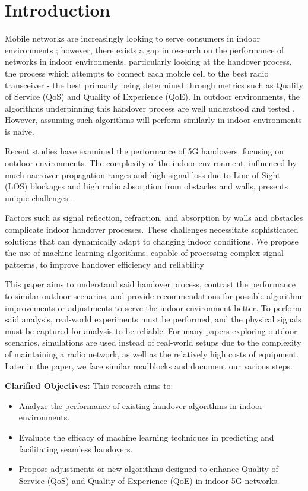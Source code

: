 \chapter{Introduction}
Mobile networks are increasingly looking to serve consumers in indoor environments \insertref; however, there exists a gap in research on the performance of networks in indoor environments, particularly looking at the handover process, the process which attempts to connect each mobile cell to the best radio transceiver - the best primarily being determined through metrics such as Quality of Service (QoS) and Quality of Experience (QoE). In outdoor environments, the algorithms underpinning this handover process are well understood and tested \insertref. However, assuming such algorithms will perform similarly in indoor environments is naive.

Recent studies have examined the performance of 5G handovers, focusing on outdoor environments. The complexity of the indoor environment, influenced by much narrower propagation ranges and high signal loss due to Line of Sight (LOS) blockages and high radio absorption from obstacles and walls, presents unique challenges \insertref.

Factors such as signal reflection, refraction, and absorption by walls and obstacles complicate indoor handover processes. These challenges necessitate sophisticated solutions that can dynamically adapt to changing indoor conditions. We propose the use of machine learning algorithms, capable of processing complex signal patterns, to improve handover efficiency and reliability \insertref

This paper aims to understand said handover process, contrast the performance to similar outdoor scenarios, and provide recommendations for possible algorithm improvements or adjustments to serve the indoor environment better. To perform said analysis, real-world experiments must be performed, and the physical signals must be captured for analysis to be reliable. For many papers exploring outdoor scenarios, simulations are used instead of real-world setups due to the complexity of maintaining a radio network, as well as the relatively high costs of equipment. Later in the paper, we face similar roadblocks and document our various steps.

\textbf{Clarified Objectives:} This research aims to:
\begin{itemize}
    \item Analyze the performance of existing handover algorithms in indoor environments.
    \item Evaluate the efficacy of machine learning techniques in predicting and facilitating seamless handovers.
    \item Propose adjustments or new algorithms designed to enhance Quality of Service (QoS) and Quality of Experience (QoE) in indoor 5G networks.
\end{itemize}

